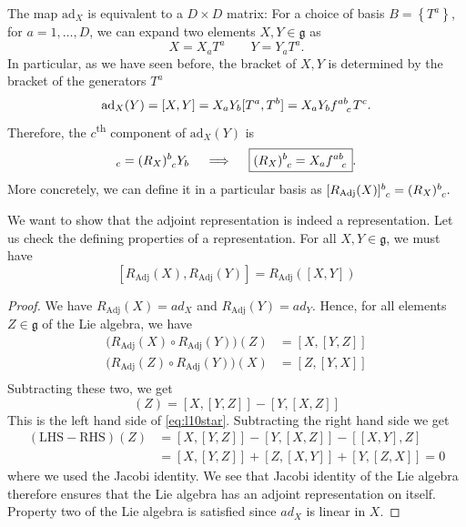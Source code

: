 The map $\text{ad}_X$ is equivalent to a $D \times D$ matrix: For a choice of basis $B = \left\{ T^a \right\}$, for $a = 1, \dots, D$, we can expand two elements $X, Y \in \mathfrak{g}$ as
\begin{equation}
  X = X_a T^a \qquad Y = Y_a T^a.
\end{equation}
In particular, as we have seen before, the bracket of $X, Y$ is determined by the bracket of the generators $T^a$
\begin{equation}
  \text{ad}_X(Y) = [X, Y] = X_a Y_b [T^a, T^b] = X_a Y_b f \indices{^a^b_c}T^c.
\end{equation}
Therefore, the $c$\textsuperscript{th} component of $\text{ad}_X(Y)$ is
\begin{equation}
  [\text{ad}_X(Y)]_c = (R_X)\indices{^{b}_{c}} Y_b \quad \implies \quad \boxed{(R_X) \indices{^b_c} = X_a f \indices{^a^b_c}}.
\end{equation}
More concretely, we can define it in a particular basis as $[R_{\text{Adj}}(X)] \indices{^b_c} = (R_X) \indices{^b_c}.$ 
\begin{claim}
  We want to show that the adjoint representation is indeed a representation.
  Let us check the defining properties of a representation.
  For all $X, Y \in \mathfrak{g}$, we must have
  \begin{equation}
    \label{eq:l10star}
    [R_{\text{Adj}}(X), R_{\text{Adj}}(Y)] = R_{\text{Adj}}([X, Y])
  \end{equation}
\end{claim}
\begin{proof}
  We have $R_{\text{Adj}}(X) = ad_X$ and $R_{\text{Adj}}(Y) = ad_Y$.
  Hence, for all elements $Z \in \mathfrak{g}$ of the Lie algebra, we have
  \begin{align}
    \bigl( R_{\text{Adj}}(X) \circ R_{\text{Adj}}(Y) \bigr)(Z) &= [X, [Y, Z]] \\
    \bigl( R_{\text{Adj}}(Z) \circ R_{\text{Adj}}(Y) \bigr)(X) &= [Z, [Y, X]] \\
  \end{align}
  Subtracting these two, we get
  \begin{equation}
    [R_{\text{Adj}}(X), R_{\text{Adj}}(Y)](Z) = [X, [Y, Z]] - [Y, [X, Z]]
  \end{equation}
  This is the left hand side of \eqref{eq:l10star}. Subtracting the right hand side we get
  \begin{align}
    (\text{LHS}- \text{RHS}) (Z) &= [X, [Y, Z]] - [Y, [X, Z] ] - [[X, Y], Z] \\
				 &= [X, [Y, Z] ] + [Z, [X, Y] ] + [Y, [Z, X] ]= 0
  \end{align}
  where we used the Jacobi identity.
  We see that Jacobi identity of the Lie algebra therefore ensures that the Lie algebra has an adjoint representation on itself.
  Property two of the Lie algebra is satisfied since $ad_X$ is linear in $X$.
\end{proof}

